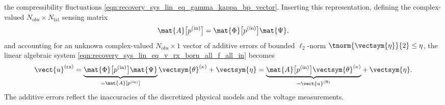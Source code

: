 the compressibility fluctuations
\eqref{eqn:recovery_sys_lin_eq_gamma_kappa_bp_vector}.
Inserting
this representation, defining
the complex-valued
$N_{\text{obs}} \times N_{\text{lat}}$ sensing matrix
\begin{equation}
  \mat{A}\bigl[ p^{(\text{in})} \bigr]
  =
  \mat{\Phi}\bigl[ p^{(\text{in})} \bigr]
  \mat{\Psi},
 \label{eqn:recovery_reg_sensing_matrix}
\end{equation}
and accounting for
an unknown complex-valued
$N_{\text{obs}} \times 1$ vector of
additive errors of
bounded $\ell_{2}$-norm
$\tnorm{ \vectsym{\eta} }{2} \leq \eta$,
the linear algebraic system
\eqref{eqn:recovery_sys_lin_eq_v_rx_born_all_f_all_in} becomes
\begin{equation}
  \vect{u}^{(\text{rx})}
  =
  \underbrace{
    \mat{\Phi}\bigl[ p^{(\text{in})} \bigr]
    \mat{\Psi}
  }_{ = \mat{A}[ p^{(\text{in})} ] }
  \vectsym{\theta}^{(\kappa)}
  +
  \vectsym{\eta}
  =
  \underbrace{
    \mat{A}\bigl[ p^{(\text{in})} \bigr]
    \vectsym{\theta}^{(\kappa)}
  }_{ = \vect{u}^{(\text{B})} }
  +\:
  \vectsym{\eta}.
 \label{eqn:recovery_reg_prob_general_obs_trans_coef_error}
\end{equation}
The additive errors reflect
the inaccuracies of
the discretized physical models and
the voltage measurements.

